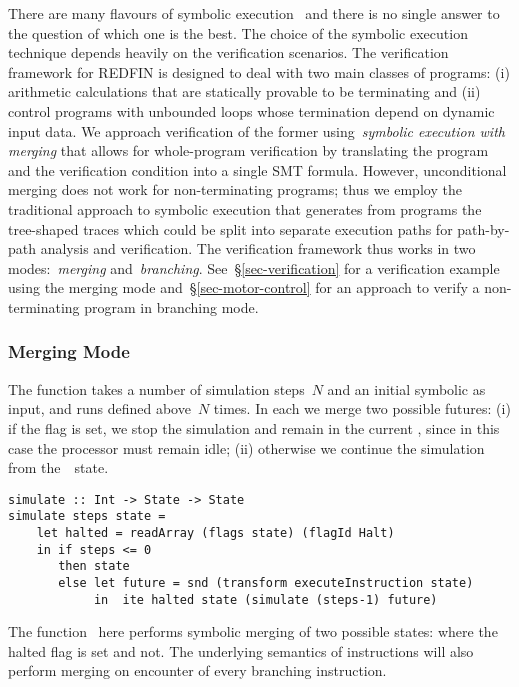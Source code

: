 There are many flavours of symbolic execution~\cite{SurveySymExec-CSUR18}
and there is no single answer to the question of which one is the best.
The choice of the symbolic execution technique depends heavily on the
verification scenarios. The verification framework for REDFIN is designed
to deal with two main classes of programs: (i) arithmetic calculations that
are statically provable to be terminating and (ii) control programs with
unbounded loops whose termination depend on dynamic input data. We approach
verification of the former using~\emph{symbolic execution with merging} that
allows for whole-program verification by translating the program and the
verification condition into a single SMT formula. However, unconditional merging
does not work for non-terminating programs; thus
we employ the traditional approach to symbolic execution that generates from programs
the tree-shaped traces which could be split into separate execution paths for path-by-path
analysis and verification. The verification framework thus works in two
modes:~\emph{merging} and~\emph{branching}. See~\S\ref{sec-verification} for
a verification example using the merging mode and~\S\ref{sec-motor-control} for
an approach to verify a non-terminating program in branching mode.

\subsubsection{Merging Mode}

The function  takes a number of simulation steps~$N$ and an initial
symbolic  as input, and runs  defined above~$N$
times. In each  we merge two possible futures: (i) if the 
flag is set, we stop the simulation and remain in the current ,
since in this case the processor must remain idle; (ii) otherwise we continue the
simulation from the~~state.


\begin{verbatim}
simulate :: Int -> State -> State
simulate steps state =
    let halted = readArray (flags state) (flagId Halt)
    in if steps <= 0
       then state
       else let future = snd (transform executeInstruction state)
            in  ite halted state (simulate (steps-1) future)
\end{verbatim}


\noindent
The function~ here performs symbolic merging of two possible states:
where the halted flag is set and not. The underlying semantics of instructions
will also perform merging on encounter of every branching instruction.

